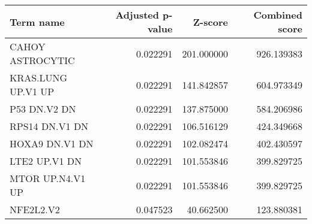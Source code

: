 \begin{tabular}{lrrr}
\toprule
         Term name &  Adjusted p-value &    Z-score &  Combined score \\
\midrule
  CAHOY ASTROCYTIC &          0.022291 & 201.000000 &      926.139383 \\
KRAS.LUNG UP.V1 UP &          0.022291 & 141.842857 &      604.973349 \\
      P53 DN.V2 DN &          0.022291 & 137.875000 &      584.206986 \\
    RPS14 DN.V1 DN &          0.022291 & 106.516129 &      424.349668 \\
    HOXA9 DN.V1 DN &          0.022291 & 102.082474 &      402.430597 \\
     LTE2 UP.V1 DN &          0.022291 & 101.553846 &      399.829725 \\
  MTOR UP.N4.V1 UP &          0.022291 & 101.553846 &      399.829725 \\
         NFE2L2.V2 &          0.047523 &  40.662500 &      123.880381 \\
\bottomrule
\end{tabular}
